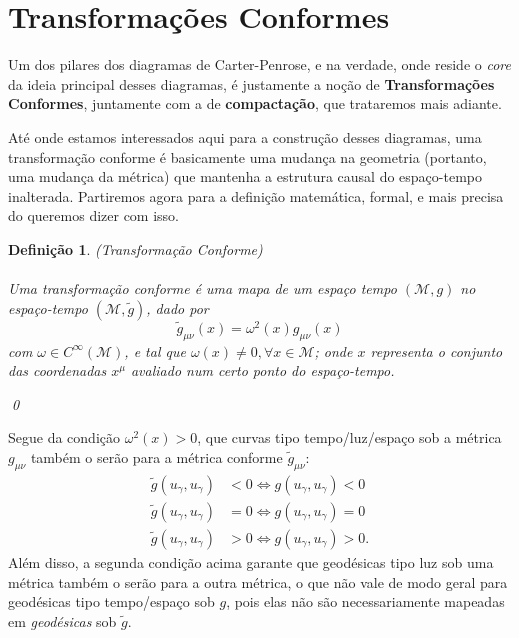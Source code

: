 \documentclass[12pt, a4paper]{article}
\theoremstyle{meuremarkstyle}
\theoremstyle{definicao}
\newtheorem*{definição}{Definição}
\begin{document}
\section{Transformações Conformes}

Um dos pilares dos diagramas de Carter-Penrose, e na verdade, onde reside o \textit{core}
da ideia principal desses diagramas, é justamente a noção de \textbf{Transformações Conformes}, juntamente com a de \textbf{compactação}, que trataremos mais adiante.

Até onde estamos interessados aqui para a construção desses diagramas, uma transformação conforme é 
basicamente uma mudança na geometria (portanto, uma mudança da métrica) que mantenha a estrutura causal do espaço-tempo
inalterada. Partiremos agora para a definição matemática, formal, e mais precisa do queremos dizer com isso.

\begin{definição}
(Transformação Conforme)\\\\
Uma \textit{transformação conforme} é uma mapa de um espaço tempo $(\mathcal{M},g)$
no espaço-tempo $(\mathcal{M},\tilde{g})$, dado por
\begin{equation*}
  \tilde{g}_{\mu\nu}(x) = \omega^2(x)g_{\mu\nu}(x)
\end{equation*}
com $\omega \in C^{\infty}(\mathcal{M})$, e tal que $\omega(x) \neq 0, \forall x \in \mathcal{M}$; onde $x$ representa o conjunto das coordenadas $x^{\mu}$ avaliado num certo ponto do espaço-tempo.
\begin{flushright}
  \qed
\end{flushright}
\end{definição}
Segue da condição $\omega^2(x)>0$, que curvas tipo tempo/luz/espaço sob a métrica $g_{\mu\nu}$ também o serão para a 
métrica conforme $\tilde{g}_{\mu\nu}$:
\begin{align*}
   \tilde{g}(u_{\gamma},u_{\gamma}) &< 0 \Longleftrightarrow  g(u_{\gamma},u_{\gamma}) < 0\\
   \tilde{g}(u_{\gamma},u_{\gamma}) &= 0 \Longleftrightarrow  g(u_{\gamma},u_{\gamma}) = 0\\
   \tilde{g}(u_{\gamma},u_{\gamma}) &> 0 \Longleftrightarrow  g(u_{\gamma},u_{\gamma}) > 0.
\end{align*}
Além disso, a segunda condição acima garante que geodésicas tipo luz sob uma métrica também o serão
para a outra métrica, o que não vale de modo geral para geodésicas tipo tempo/espaço sob $g$, pois elas não
são necessariamente mapeadas em \textit{geodésicas} sob $\tilde{g}$.
\end{document}
